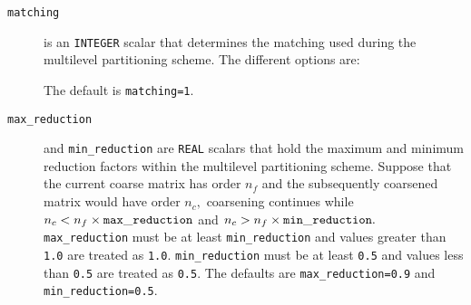 \begin{description}

\item[\texttt{matching}] is an {\tt INTEGER} scalar that determines the matching used during the multilevel partitioning scheme. The different options are: 
The default is {\tt matching=1}.



\item[\texttt{max\_reduction}] and {\tt min\_reduction} are {\tt REAL} scalars that hold the maximum and minimum reduction factors within the multilevel partitioning scheme. Suppose that the current coarse matrix has order $n_f$ and 
the subsequently coarsened matrix would have order $n_c,$ coarsening continues while $n_c<n_f\times{\tt max\_reduction}$ and 
$n_c>n_f\times{\tt min\_reduction}.$ {\tt max\_reduction} must be at least {\tt min\_reduction} and values greater than 
{\tt 1.0} are treated as {\tt 1.0}. {\tt min\_reduction} must be at least {\tt 0.5} and values less than 
{\tt 0.5} are treated as {\tt 0.5}. The defaults are {\tt max\_reduction=0.9} and {\tt min\_reduction=0.5}.












\end{description}
